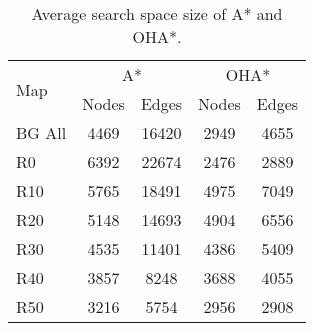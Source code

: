 \begin{table}
  \caption{Average search space size of A* and OHA*.}
	\vspace{-2em}
  \label{table-graphsize}
  \centering
  \begin{tabular}{lcccc}
   \hline
  \multirow{2}{*}{Map} & \multicolumn{2}{c}{A*} & \multicolumn{2}{c}{OHA*} \\
	\cline{2-3}
	\cline{4-5}
	& Nodes & Edges & Nodes & Edges \\
\hline
BG All &  4469 & 16420 & 2949 &  4655 \\
R0 & 6392 & 22674 & 2476 & 2889 \\
R10 & 5765 & 18491 & 4975 & 7049 \\
R20 & 5148 & 14693  & 4904 & 6556 \\ 
R30 & 4535 & 11401 & 4386 & 5409 \\
R40 & 3857 & 8248 & 3688 & 4055 \\
R50 & 3216 & 5754 & 2956 & 2908 \\ 
   \hline
\end{tabular}
\end{table}

